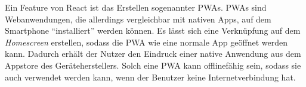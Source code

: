 Ein Feature von React ist das Erstellen sogenannter \acp{PWA}.
\aclp{PWA} sind Webanwendungen, die allerdings vergleichbar mit nativen Apps, auf dem Smartphone \enquote{installiert} werden können.
Es lässt sich eine Verknüpfung auf dem \emph{Homescreen} erstellen, sodass die \acs{PWA} wie eine normale App geöffnet werden kann.
Dadurch erhält der Nutzer den Eindruck einer native Anwendung aus dem Appstore des Geräteherstellers.
Solch eine \ac{PWA} kann offlinefähig sein, sodass sie auch verwendet werden kann, wenn der Benutzer keine Internetverbindung hat. \autocite[Vgl.][]{hartmann2019react}
